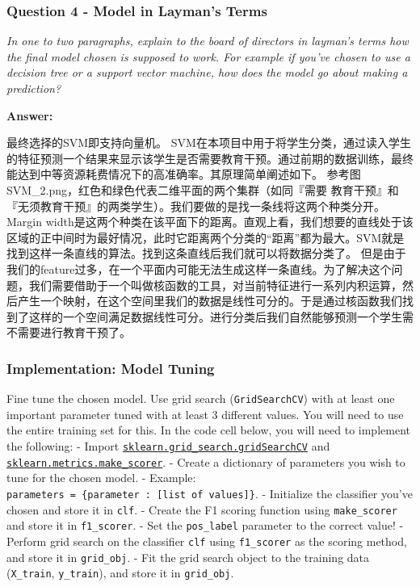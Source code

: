 \documentclass{ctexart}
\begin{document}
    \subsubsection{Question 4 - Model in Layman's
Terms}\label{question-4---model-in-laymans-terms}

\emph{In one to two paragraphs, explain to the board of directors in
layman's terms how the final model chosen is supposed to work. For
example if you've chosen to use a decision tree or a support vector
machine, how does the model go about making a prediction?}

    \textbf{Answer: }

最终选择的SVM即支持向量机。
SVM在本项目中用于将学生分类，通过读入学生的特征预测一个结果来显示该学生是否需要教育干预。通过前期的数据训练，最终能达到中等资源耗费情况下的高准确率。其原理简单阐述如下。
参考图SVM\_2.png，红色和绿色代表二维平面的两个集群（如同『需要
教育干预』和『无须教育干预』的两类学生）。我们要做的是找一条线将这两个种类分开。Margin
width是这两个种类在该平面下的距离。直观上看，我们想要的直线处于该区域的正中间时为最好情况，此时它距离两个分类的``距离''都为最大。SVM就是找到这样一条直线的算法。找到这条直线后我们就可以将数据分类了。
但是由于我们的feature过多，在一个平面内可能无法生成这样一条直线。为了解决这个问题，我们需要借助于一个叫做核函数的工具，对当前特征进行一系列内积运算，然后产生一个映射，在这个空间里我们的数据是线性可分的。于是通过核函数我们找到了这样的一个空间满足数据线性可分。进行分类后我们自然能够预测一个学生需不需要进行教育干预了。

    \subsubsection{Implementation: Model
Tuning}\label{implementation-model-tuning}

Fine tune the chosen model. Use grid search (\texttt{GridSearchCV}) with
at least one important parameter tuned with at least 3 different values.
You will need to use the entire training set for this. In the code cell
below, you will need to implement the following: - Import
\href{http://scikit-learn.org/stable/modules/generated/sklearn.grid_search.GridSearchCV.html}{\texttt{sklearn.grid\_search.gridSearchCV}}
and
\href{http://scikit-learn.org/stable/modules/generated/sklearn.metrics.make_scorer.html}{\texttt{sklearn.metrics.make\_scorer}}.
- Create a dictionary of parameters you wish to tune for the chosen
model. - Example:
\texttt{parameters\ =\ \{\textquotesingle{}parameter\textquotesingle{}\ :\ {[}list\ of\ values{]}\}}.
- Initialize the classifier you've chosen and store it in \texttt{clf}.
- Create the F1 scoring function using \texttt{make\_scorer} and store
it in \texttt{f1\_scorer}. - Set the \texttt{pos\_label} parameter to
the correct value! - Perform grid search on the classifier \texttt{clf}
using \texttt{f1\_scorer} as the scoring method, and store it in
\texttt{grid\_obj}. - Fit the grid search object to the training data
(\texttt{X\_train}, \texttt{y\_train}), and store it in
\texttt{grid\_obj}.
\end{document}
